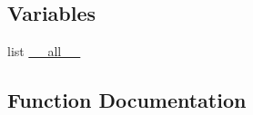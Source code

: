 \subsection*{Variables}
\begin{DoxyCompactItemize}
\item 
list \hyperlink{namespacescipy_1_1ndimage_1_1measurements_a17b33fc777402ef9fdbe9d54340d2721}{\+\_\+\+\_\+all\+\_\+\+\_\+}
\end{DoxyCompactItemize}


\subsection{Function Documentation}
\hypertarget{namespacescipy_1_1ndimage_1_1measurements_a9e05486d5384d50578bb640fd51f3c76}{}

